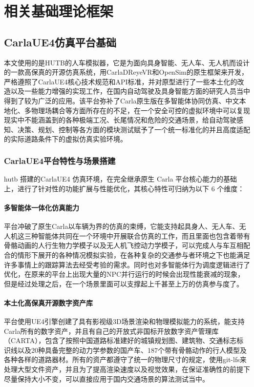 \chapter{相关基础理论框架}

\section{CarlaUE4仿真平台基础}

本文使用的是HUTB的人车模拟器，它是为面向具身智能、无人车、无人机而设计的一款高保真的开源仿真系统，用CarlaDReyeVR和OpenSim的原生框架来开发，严格遵照了CarlaUE4核心技术规范和API标准，并对原型进行了一些本土化的改造以及一些能力增强的实现工作，在国内自动驾驶及具身智能方面的研究人员当中得到了较为广泛的应用。该平台弥补了Carla原生版在多智能体协同仿真、中文本地化、多物理场耦合等方面所存在的不足，在一个安全可控的虚拟环境中可以复现现实中不能涵盖到的各种极端工况、长尾情况和危险的交通场景，给自动驾驶感知、决策、规划、控制等各方面的模块测试赋予了一个统一标准化的并且高度适配的实际道路条件下的虚拟仿真实验环境。

\subsection{CarlaUE4平台特性与场景搭建}

hutb 搭建的CarlaUE4 仿真环境，在完全继承原生 Carla 平台核心能力的基础上，进行了针对性的功能扩展与性能优化，其核心特性可归纳为以下 6 个维度：

\subsubsection{多智能体一体化仿真能力}

平台冲破了原生Carla以车辆为界的仿真的束缚，它能支持起具身人、无人车、无人机这三种智能体共同在一个环境中开展联合仿真的工作，而且里面也包含着带有骨骼动画的人行生物力学模子以及无人机飞控动力学模子，可以完成人与车互相配合的情形下展开的各种情况模拟实验，在各种复杂的交通参与者环境之下也能满足许多事情上的跟踪算法去经受考验的需求。同时也对多智能体行为调度逻辑进行了优化，在原来的平台上出现大量的NPC并行运行的时候会出现性能衰减的现象，但是经过处理之后，在一个场景里面可以支撑起上千甚至上万的仿真参与度了。

\subsubsection{本土化高保真开源数字资产库}

平台使用UE4引擎创建了具有影视级3D场景渲染和物理模拟能力的系统，能支持Carla所有的数字资产，并且有自己的开放式非国标开放数字资产管理库（CARTA），包含了按照中国道路标准建好的城镇规划图、建筑物、交通标志标识线以及20种具备完整的动力学参数的国产车、187个带有骨骼动作的行人模型及各种各样的道路器材\cite{zhao2025carlascene}。所有的资产都遵守了统一的物理尺寸的规定，使用git-lfs来处理大型文件资产，并且为了提高渲染速度以及视觉效果，在保证准确性的前提下尽量保持大小不变，可以直接应用于国内交通场景的算法测试当中\cite{li2025virtual}。

